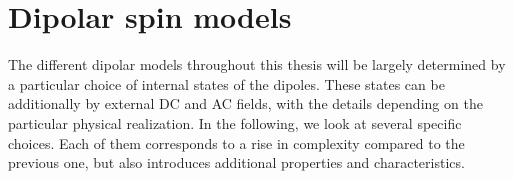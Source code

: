 

\section{Dipolar spin models}
The different dipolar models throughout this thesis will be largely determined by a particular choice of internal states of the dipoles. These states can be additionally  by external DC and AC fields, with the details depending on the particular physical realization.
In the following, we look at several specific choices. Each of them corresponds to a rise in complexity compared to the previous one, but also introduces additional properties and characteristics.

